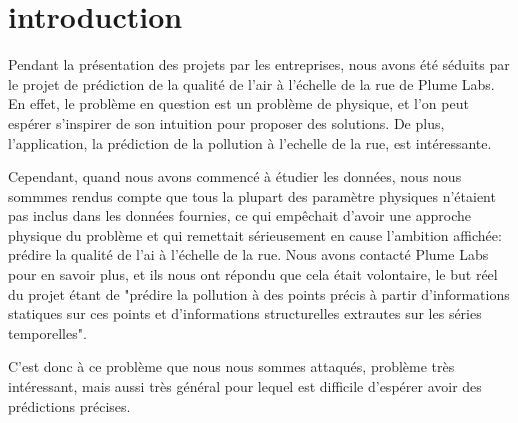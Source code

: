 \section*{introduction}

Pendant la présentation des projets par les entreprises, nous avons été séduits par le projet de prédiction de la qualité de l'air à l'échelle de la rue de Plume Labs.
En effet, le problème en question est un problème de physique, et l'on peut espérer s'inspirer de son intuition pour proposer des solutions.
De plus, l'application, la prédiction de la pollution à l'echelle de la rue, est intéressante.

Cependant, quand nous avons commencé à étudier les données, nous nous sommmes rendus compte que tous la plupart des paramètre physiques n'étaient pas inclus dans les données fournies, ce qui empêchait d'avoir une approche physique du problème et qui remettait sérieusement en cause l'ambition affichée: prédire la qualité de l'ai à l'échelle de la rue.
Nous avons contacté Plume Labs pour en savoir plus, et ils nous ont répondu que cela était volontaire, le but réel du projet étant de "prédire la pollution à des points précis à partir d'informations statiques sur ces points et d'informations structurelles extrautes sur les séries temporelles".

C'est donc à ce problème que nous nous sommes attaqués, problème très intéressant, mais aussi très général pour lequel est difficile d'espérer avoir des prédictions précises.

